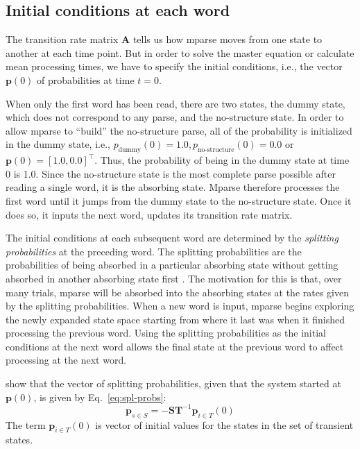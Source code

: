 \documentclass[a4paper, 12pt]{article}
\begin{document}
\subsection{Initial conditions at each word}
The transition rate matrix $\mathbf{A}$ tells us how mparse moves from one
state to another at each time point. But in order to solve the master equation
or calculate mean processing times, we have to specify the initial conditions,
i.e., the vector $\mathbf{p}(0)$ of probabilities at time $t = 0$.

When only the first word has been read, there are two states, the dummy state,
which does not correspond to any parse, and the no-structure state. In order to
allow mparse to ``build'' the no-structure parse, all of the probability is
initialized in the dummy state, i.e., $p_{\text{dummy}}(0) = 1.0,
p_{\text{no-structure}}(0) = 0.0$ or $\mathbf{p}(0) = [1.0, 0.0]^\intercal$.
Thus, the probability of being in the dummy state at time 0 is 1.0. Since the
no-structure state is the most complete parse possible after reading a single
word, it is the absorbing state. Mparse therefore processes the first word
until it jumps from the dummy state to the no-structure state. Once it does so,
it inputs the next word, updates its transition rate matrix.

The initial conditions at each subsequent word are determined by the
\emph{splitting probabilities} at the preceding word. The splitting
probabilities are the probabilities of being absorbed in a particular absorbing
state without getting absorbed in another absorbing state first
\citep{vankampen2007stochastic, iyer-biswas2016first, polizzi2016mean,
    park2003reaction, valleriani2014unveiling}. The motivation for this is
that, over many trials, mparse will be absorbed into the absorbing states at
the rates given by the splitting probabilities. When a new word is input,
mparse begins exploring the newly expanded state space starting from where it
last was when it finished processing the previous word. Using the splitting
probabilities as the initial conditions at the next word allows the final state
at the previous word to affect processing at the next word.

\citet{valleriani2014unveiling} show that the vector of splitting probabilities,
given that the system started at $\mathbf{p}(0)$, is given by
Eq.~\ref{eq:spl-probs}:
\begin{equation}\label{eq:spl-probs}
    \mathbf{p}_{s \in S} = -\mathbf{S}\mathbf{T}^{-1}\mathbf{p}_{i \in T}(0)
\end{equation}
The term $\mathbf{p}_{i \in T}(0)$ is vector of initial values for the states
in the set of transient states.
\end{document}
